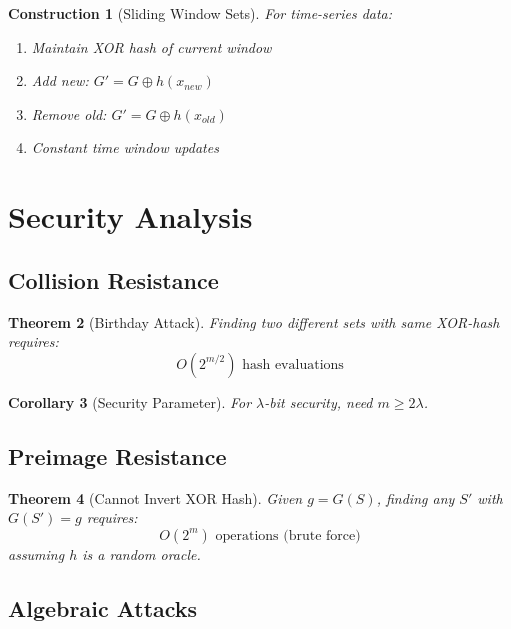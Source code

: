 \documentclass[11pt,final,hidelinks]{article}
\newcommand{\XOR}{\oplus}
\newtheorem{theorem}{Theorem}[section]
\newtheorem{corollary}[theorem]{Corollary}
\newtheorem{construction}[theorem]{Construction}
\begin{document}
\begin{construction}[Sliding Window Sets]
For time-series data:
\begin{enumerate}
    \item Maintain XOR hash of current window
    \item Add new: $G' = G \XOR h(x_{new})$
    \item Remove old: $G' = G \XOR h(x_{old})$
    \item Constant time window updates
\end{enumerate}
\end{construction}

\section{Security Analysis}

\subsection{Collision Resistance}

\begin{theorem}[Birthday Attack]
Finding two different sets with same XOR-hash requires:
\begin{equation}
O(2^{m/2}) \text{ hash evaluations}
\end{equation}
\end{theorem}

\begin{corollary}[Security Parameter]
For $\lambda$-bit security, need $m \geq 2\lambda$.
\end{corollary}

\subsection{Preimage Resistance}

\begin{theorem}[Cannot Invert XOR Hash]
Given $g = G(S)$, finding any $S'$ with $G(S') = g$ requires:
\begin{equation}
O(2^m) \text{ operations (brute force)}
\end{equation}
assuming $h$ is a random oracle.
\end{theorem}

\subsection{Algebraic Attacks}
\end{document}
